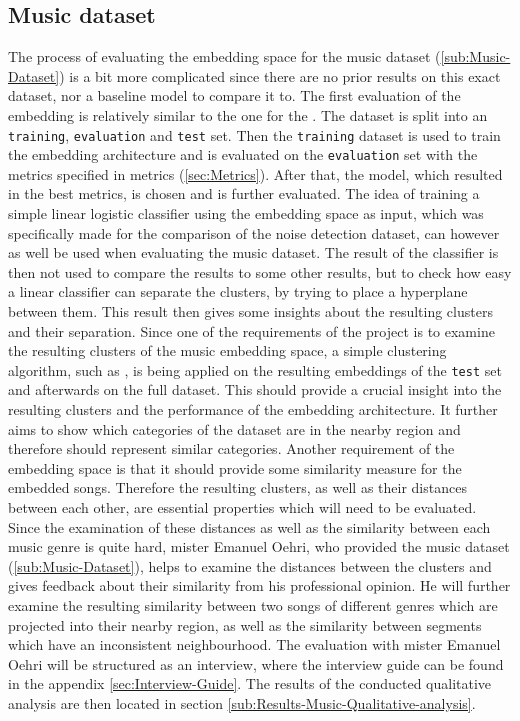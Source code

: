 \subsection{Music dataset}
\label{sub:Eval-Music}
The process of evaluating the embedding space for the music dataset (\ref{sub:Music-Dataset}) is a bit more complicated since there are no prior results on this exact dataset, nor a baseline model to compare it to. The first evaluation of the embedding is relatively similar to the one for the . The dataset is split into an \texttt{training}, \texttt{evaluation} and \texttt{test} set. Then the \texttt{training} dataset is used to train the embedding architecture and is evaluated on the \texttt{evaluation} set with the metrics specified in metrics (\ref{sec:Metrics}). After that, the model, which resulted in the best metrics, is chosen and is further evaluated.
\newline
\newline
The idea of training a simple linear logistic classifier using the embedding space as input, which was specifically made for the comparison of the noise detection dataset, can however as well be used when evaluating the music dataset. The result of the classifier is then not used to compare the results to some other results, but to check how easy a linear classifier can separate the clusters, by trying to place a hyperplane between them. This result then gives some insights about the resulting clusters and their separation.
\newline
\newline
Since one of the requirements of the project is to examine the resulting clusters of the music embedding space, a simple clustering algorithm, such as , is being applied on the resulting embeddings of the \texttt{test} set and afterwards on the full dataset. This should provide a crucial insight into the resulting clusters and the performance of the embedding architecture. It further aims to show which categories of the dataset are in the nearby region and therefore should represent similar categories. 
\newline
\newline
Another requirement of the embedding space is that it should provide some similarity measure for the embedded songs. Therefore the resulting clusters, as well as their distances between each other, are essential properties which will need to be evaluated. Since the examination of these distances as well as the similarity between each music genre is quite hard, mister Emanuel Oehri, who provided the music dataset (\ref{sub:Music-Dataset}), helps to examine the distances between the clusters and gives feedback about their similarity from his professional opinion. He will further examine the resulting similarity between two songs of different genres which are projected into their nearby region, as well as the similarity between segments which have an inconsistent neighbourhood. The evaluation with mister Emanuel Oehri will be structured as an interview, where the interview guide can be found in the appendix \ref{sec:Interview-Guide}. The results of the conducted qualitative analysis are then located in section \ref{sub:Results-Music-Qualitative-analysis}.

